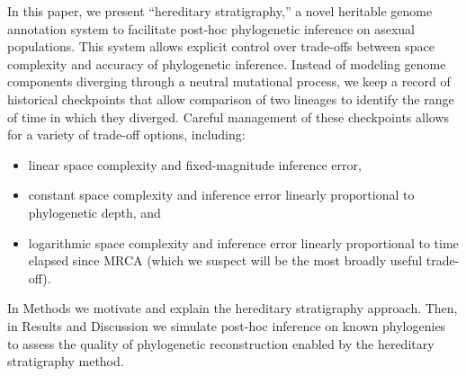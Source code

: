 In this paper, we present ``hereditary stratigraphy,'' a novel heritable genome annotation system to facilitate post-hoc phylogenetic inference on asexual populations.
This system allows explicit control over trade-offs between space complexity and accuracy of phylogenetic inference.
Instead of modeling genome components diverging through a neutral mutational process, we keep a record of historical checkpoints that allow comparison of two lineages to identify the range of time in which they diverged.
Careful management of these checkpoints allows for a variety of trade-off options, including:
\begin{itemize}
  \item linear space complexity and fixed-magnitude inference error,
  \item constant space complexity and inference error linearly proportional to phylogenetic depth, and
  \item logarithmic space complexity and inference error linearly proportional to time elapsed since MRCA (which we suspect will be the most broadly useful trade-off).
\end{itemize}

In Methods we motivate and explain the hereditary stratigraphy approach.
Then, in Results and Discussion we simulate post-hoc inference on known phylogenies to assess the quality of phylogenetic reconstruction enabled by the hereditary stratigraphy method.
